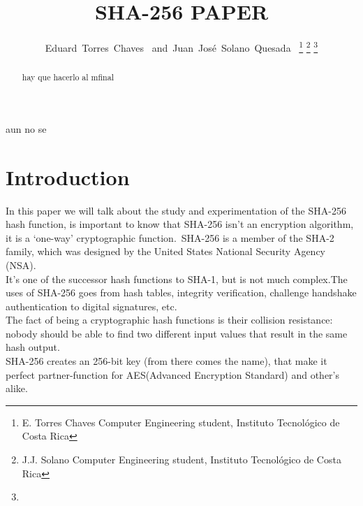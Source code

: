 \documentclass[journal]{IEEEtran}
\begin{document}
\title{SHA-256 PAPER}
\author{Eduard~Torres~Chaves~\IEEEmembership{}
        and~Juan~José~Solano~Quesada~\IEEEmembership{}
\thanks{E. Torres Chaves Computer Engineering student, Instituto Tecnológico de Costa Rica}%
\thanks{J.J. Solano Computer Engineering student, Instituto Tecnológico de Costa Rica}%
\thanks{}}
\maketitle
\begin{abstract}
hay que hacerlo al mfinal 

\end{abstract}
\begin{IEEEkeywords}
aun no se 
\end{IEEEkeywords}
\IEEEpeerreviewmaketitle

\section{Introduction}
In this paper we will talk about the study and experimentation of the SHA-256 hash function, is important to know that SHA-256 isn't an encryption algorithm, it is a ‘one-way’ cryptographic function.\ SHA-256 is a member of the SHA-2 family, which was designed by the United States National Security Agency (NSA).\\ It's one of the successor hash functions to SHA-1, but is not much complex.The uses of SHA-256 goes from hash tables, integrity verification, challenge handshake authentication to digital signatures, etc.\\ 
The fact of being a cryptographic hash functions is their collision resistance: nobody should be able to find two different input values that result in the same hash output.\\
SHA-256 creates an 256-bit key (from there comes the name), that make it perfect partner-function for AES(Advanced Encryption Standard) and other's alike.
\end{document}
